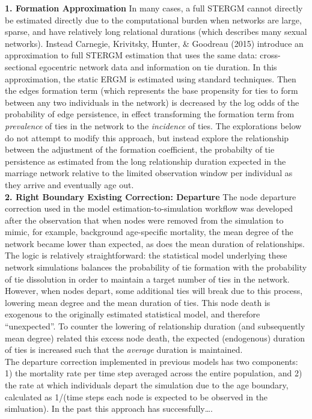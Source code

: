 \documentclass [11pt, proquest] {uwthesis}[2015/03/03]
\begin{document}
\textbf{1. Formation Approximation} In many cases, a full STERGM cannot
directly be estimated directly due to the computational burden when
networks are large, sparse, and have relatively long relational
durations (which describes many sexual networks). Instead Carnegie,
Krivitsky, Hunter, \& Goodreau (2015) introduce an approximation to full
STERGM estimation that uses the same data: cross-sectional egocentric
network data and information on tie duration. In this approximation, the
static ERGM is estimated using standard techniques. Then the edges
formation term (which represents the base propensity for ties to form
between any two individuals in the network) is decreased by the log odds
of the probability of edge persistence, in effect transforming the
formation term from \emph{prevalence} of ties in the network to the
\emph{incidence} of ties. The explorations below do not attempt to
modify this approach, but instead explore the relationship between the
adjustment of the formation coefficient, the probabilty of tie
persistence as estimated from the long relationship duration expected in
the marriage network relative to the limited observation window per
individual as they arrive and eventually age out.\\
\textbf{2. Right Boundary Existing Correction: Departure} The node
departure correction used in the model estimation-to-simulation workflow
was developed after the observation that when nodes were removed from
the simulation to mimic, for example, background age-specific mortality,
the mean degree of the network became lower than expected, as does the
mean duration of relationships. The logic is relatively straightforward:
the statistical model underlying these network simulations balances the
probability of tie formation with the probability of tie dissolution in
order to maintain a target number of ties in the network. However, when
nodes depart, some additional ties will break due to this process,
lowering mean degree and the mean duration of ties. This node death is
exogenous to the originally estimated statistical model, and therefore
``unexpected''. To counter the lowering of relationship duration (and
subsequently mean degree) related this excess node death, the expected
(endogenous) duration of ties is increased such that the \emph{average}
duration is maintained.\\
The departure correction implemented in previous models has two
components: 1) the mortality rate per time step averaged across the
entire population, and 2) the rate at which individuals depart the
simulation due to the age boundary, calculated as 1/(time steps each
node is expected to be observed in the simluation). In the past this
approach has successfully\ldots{}.
\end{document}
